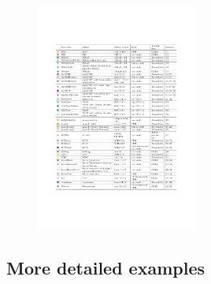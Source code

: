 \documentclass{beamer}\usepackage[]{graphicx}\usepackage[]{color}
\begin{document}
\begin{frame}
\begin{center}
\begin{figure}
\includegraphics[trim={0 5cm 0 5cm}, clip, height=7.5cm]{Images/Robinson-2018.pdf}
\caption{\cite{Soneson2018}}
\end{figure}
\end{center}
\end{frame}

\subsection{More detailed examples}
\begin{frame}
\begin{center}
\insertsubsection
\end{center}
\end{frame}
\end{document}
